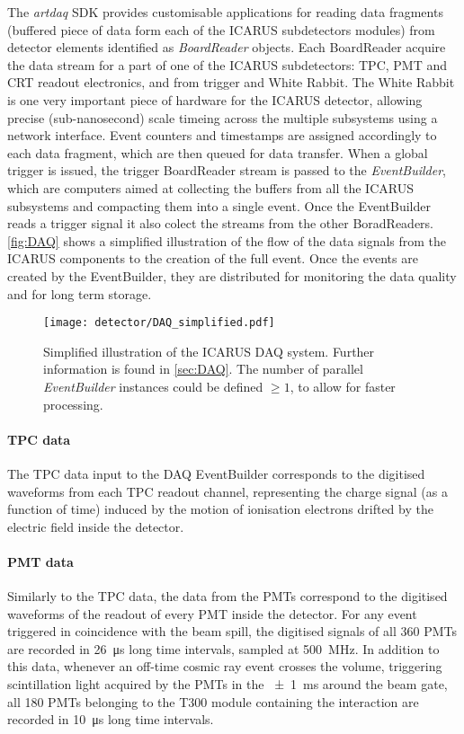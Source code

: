 The \emph{artdaq} SDK provides  customisable applications for reading data fragments (buffered piece of data form each of the ICARUS subdetectors modules) from detector elements identified as \emph{BoardReader} objects. Each BoardReader acquire the data stream for a part of one of the ICARUS subdetectors: TPC, PMT and CRT readout electronics, and from trigger and White Rabbit. 
The White Rabbit is one very important piece of hardware for the ICARUS detector, allowing precise (sub-nanosecond) scale timeing across the multiple subsystems using a network interface. 
Event counters and timestamps are assigned accordingly to each data fragment, which are then queued for data transfer. 
When a global trigger is issued, the trigger BoardReader stream is passed to the \emph{EventBuilder}, which are computers aimed at collecting the buffers from all the ICARUS subsystems and compacting them into a single event. Once the EventBuilder reads a trigger signal it also colect the streams from the other BoradReaders.  \autoref{fig:DAQ} shows a simplified illustration of the flow of the data signals from the ICARUS components to the creation of the full event. Once the events are created by the EventBuilder, they are distributed for monitoring the data quality and for long term storage. 

\begin{figure}
    \centering
    \texttt{[image: detector/DAQ\_simplified.pdf]}
    \caption[ICARUS DAQ illustration]{Simplified illustration of the ICARUS DAQ system. Further information is found in \autoref{sec:DAQ}. The number of parallel \emph{EventBuilder} instances could be defined $\geq1$, to allow for faster processing.}
    \label{fig:DAQ}
\end{figure}

\paragraph{TPC data} The TPC data input to the DAQ EventBuilder corresponds to the digitised waveforms from each TPC readout channel, representing the charge signal (as a function of time) induced by the motion of ionisation electrons drifted by the electric field inside the detector. 

\paragraph{PMT data} Similarly to the TPC data, the data from the PMTs correspond to the digitised waveforms of the readout of every PMT inside the detector. For any event triggered in coincidence with the beam spill, the digitised signals of all 360 PMTs are recorded in \SI{26}{\us} long time intervals, sampled at \SI{500}{\mega\hertz}. In addition to this data, whenever an off-time cosmic ray event crosses the volume, triggering scintillation light acquired by the PMTs in the \SI{+-1}{\ms} around the beam gate, all 180 PMTs belonging to the T300 module containing the interaction are recorded in \SI{10}{\us} long time intervals. 

